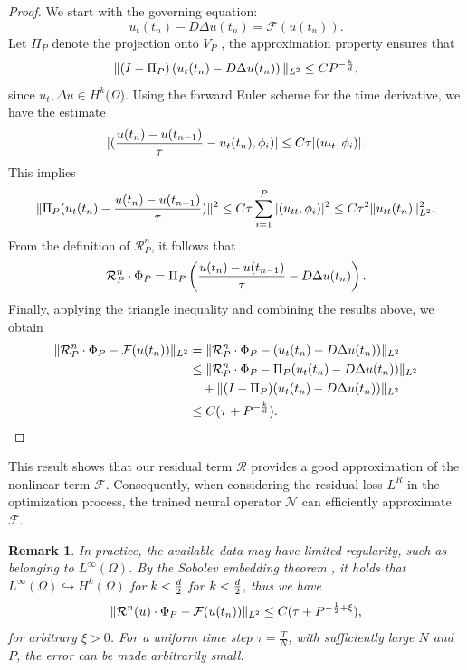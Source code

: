 \documentclass[preprint,12pt]{elsarticle}
\theoremstyle{plain}
\newtheorem{remark}{Remark}[section]
\numberwithin{figure}{section}
\numberwithin{table}{section}
\begin{document}
\begin{proof}
	We start with the governing equation:
	$$
	u_t(t_n)-D\Delta u(t_n) = \mathcal{F}(u(t_n)).
	$$
	Let  $\Pi_P$ denote the projection onto $V_P$ , the approximation property ensures that
	$$
	\|(I-\Pi_P)\left(u_t(t_n) -D\Delta u(t_n) \right)\|_{L^2} \le CP^{-{k\over d}},
	$$ 
	since $u_t,\Delta u\in H^k(\Omega$). Using the forward Euler scheme for the time derivative, we have the estimate
	$$
	|({u(t_n)-u(t_{n-1})\over \tau}-u_t(t_n),\phi_i)| \le C\tau |(u_{tt},\phi_i)|.
	$$
	This implies 
	$$
	\|\Pi_P (u_t(t_n) - {u(t_n)-u(t_{n-1})\over \tau})\|^2 \le C\tau\sum_{i=1}^P |(u_{tt},\phi_i)|^2 \le C\tau^2 \|u_{tt}(t_n)\|_{L^2}^2.
	$$
	From the definition of $\mathcal{R}_P^n$, it follows that
	$$
	\mathcal{R}_P^n\cdot\Phi_P=\Pi_P \left({u(t_n)-u(t_{n-1})\over \tau}-D\Delta u(t_n)\right).
	$$
	Finally, applying the triangle inequality and combining the results above, we obtain
	$$
	\begin{aligned}
		\|\mathcal{R}_P^n\cdot\Phi_P-\mathcal{F}(u(t_n))\|_{L^2} &=\|\mathcal{R}_P^n\cdot\Phi_P-(u_t(t_n)-D\Delta u(t_n))\|_{L^2}\\
		&\le \|\mathcal{R}_P^n\cdot\Phi_P - \Pi_P (u_t(t_n)-D\Delta u(t_n))\|_{L^2}\\
        &\quad+ \|(I-\Pi_P )(u_t(t_n)-D\Delta u(t_n))\|_{L^2}\\
		&\le C(\tau +P^{-{k\over d}}).
	\end{aligned}
	$$
\end{proof}
This result shows that our residual term $\mathcal{R}$ provides a good approximation of the nonlinear term $\mathcal{F}$. Consequently, when considering the residual loss $L^R$ in the optimization process, the trained neural operator $\mathcal{N}$ can efficiently approximate $\mathcal{F}$.

\begin{remark}
	In practice, the available data may have limited regularity, such as belonging to $L^\infty(\Omega)$. By the Sobolev embedding theorem  \cite{adams2003sobolev}, it holds that $L^\infty(\Omega) \hookrightarrow H^k(\Omega)$ for $k<{d\over 2}$ for $k<{d\over 2}$, thus we have 
	\begin{equation}
		\|\mathcal{R}^n(u)\cdot \Phi_P-\mathcal{F}(u(t_n))\|_{L^2}\le C(\tau + P^{-{1\over 2}+\xi}),
	\end{equation}
	for arbitrary $\xi >0$. For a uniform time step $\tau = \frac{T}{N}$, with sufficiently large $N$ and $P$, the error can be made arbitrarily small.
\end{remark}
\end{document}
